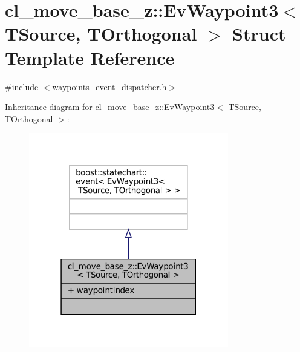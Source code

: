 \hypertarget{structcl__move__base__z_1_1EvWaypoint3}{}\section{cl\+\_\+move\+\_\+base\+\_\+z\+:\+:Ev\+Waypoint3$<$ T\+Source, T\+Orthogonal $>$ Struct Template Reference}
\label{structcl__move__base__z_1_1EvWaypoint3}


{\ttfamily \#include $<$waypoints\+\_\+event\+\_\+dispatcher.\+h$>$}



Inheritance diagram for cl\+\_\+move\+\_\+base\+\_\+z\+:\+:Ev\+Waypoint3$<$ T\+Source, T\+Orthogonal $>$\+:
\nopagebreak
\begin{figure}[H]
\begin{center}
\leavevmode
\includegraphics[width=247pt]{structcl__move__base__z_1_1EvWaypoint3__inherit__graph}
\end{center}
\end{figure}


